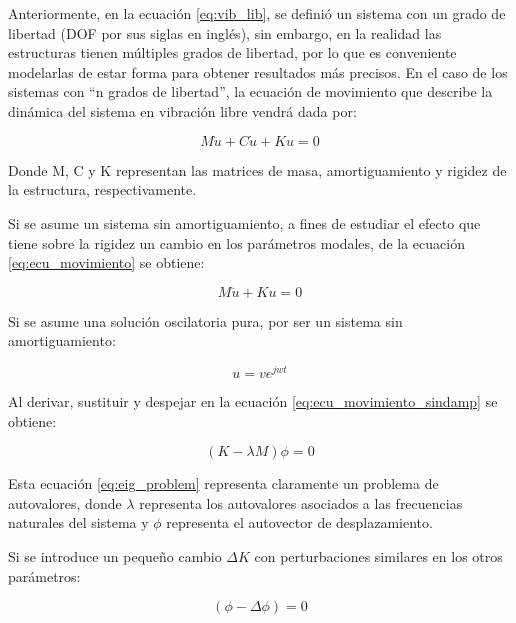 Anteriormente, en la ecuación \ref{eq:vib_lib}, se definió un sistema con un grado de libertad (DOF por sus siglas en inglés), sin embargo, en la realidad las estructuras tienen múltiples grados de libertad, por lo que es conveniente modelarlas de estar forma para obtener resultados más precisos. En el caso de los sistemas con ``n grados de libertad'', la ecuación de movimiento que describe la dinámica del sistema en vibración libre vendrá dada por:

\begin{equation} \label{eq:ecu_movimiento}
    M\ddot{u} + C\dot{u} + Ku = 0
\end{equation}

Donde M, C y K representan las matrices de masa, amortiguamiento y rigidez de la estructura, respectivamente.

Si se asume un sistema sin amortiguamiento, a fines de estudiar el efecto que tiene sobre la rigidez un cambio en los parámetros modales,  de la ecuación \ref{eq:ecu_movimiento} se obtiene: 

\begin{equation} \label{eq:ecu_movimiento_sindamp}
    M\ddot{u} + Ku = 0
\end{equation}

Si se asume una solución oscilatoria pura, por ser un sistema sin amortiguamiento:

\begin{equation} \label{eq:sol_ecu_motion}
    u = ve^{jwt}
\end{equation}

Al derivar, sustituir y despejar en la ecuación \ref{eq:ecu_movimiento_sindamp} se obtiene:

\begin{equation} \label{eq:eig_problem}
    (K - \lambda M)\phi = 0
\end{equation}

Esta ecuación \ref{eq:eig_problem} representa claramente un problema de autovalores, donde $\lambda$ representa los autovalores asociados a las frecuencias naturales del sistema y $\phi$ representa el autovector de desplazamiento.

Si se introduce un pequeño cambio $\Delta K$ con perturbaciones similares en los otros parámetros:

\begin{equation}
    [(K - \Delta K) - (\lambda - \Delta\lambda)(M - \Delta M)](\phi - \Delta\phi) = 0
\end{equation}


